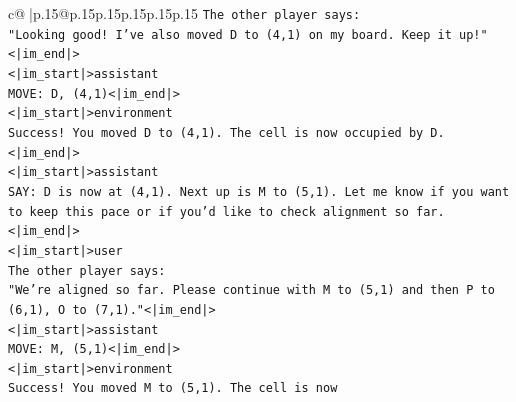 \documentclass{article}
\begin{document}
{\begin{supertabular}{c@{$\;$}|p{.15\linewidth}@{}p{.15\linewidth}p{.15\linewidth}p{.15\linewidth}p{.15\linewidth}p{.15\linewidth}}
{{{\texttt{The other player says:} \\
\texttt{"Looking good! I've also moved D to (4,1) on my board. Keep it up!"<|im\_end|>} \\
\texttt{<|im\_start|>assistant} \\
\texttt{MOVE: D, (4,1)<|im\_end|>} \\
\texttt{<|im\_start|>environment} \\
\texttt{Success! You moved D to (4,1). The cell is now occupied by D.<|im\_end|>} \\
\texttt{<|im\_start|>assistant} \\
\texttt{SAY: D is now at (4,1). Next up is M to (5,1). Let me know if you want to keep this pace or if you'd like to check alignment so far.<|im\_end|>} \\
\texttt{<|im\_start|>user} \\
\texttt{The other player says:} \\
\texttt{"We're aligned so far. Please continue with M to (5,1) and then P to (6,1), O to (7,1)."<|im\_end|>} \\
\texttt{<|im\_start|>assistant} \\
\texttt{MOVE: M, (5,1)<|im\_end|>} \\
\texttt{<|im\_start|>environment} \\
\texttt{Success! You moved M to (5,1). The cell is now} \\
            }
        }
    }
     \\ \\


\end{supertabular}}
\end{document}
